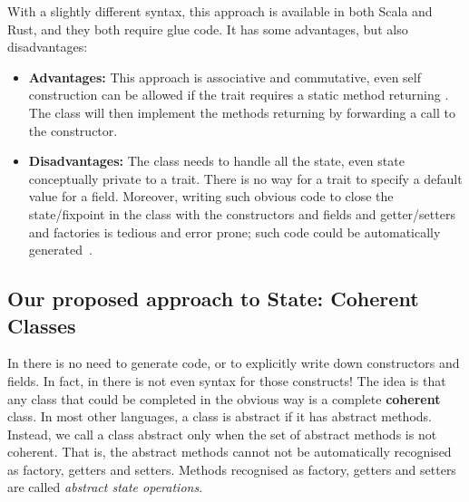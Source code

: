 \saveSpace\saveSpace

\noindent 

With a slightly different syntax, this approach is available in both Scala and Rust, and they both require glue code.
It has some advantages, but also disadvantages: 

\begin{itemize}

\item {\bf Advantages:} This approach is associative and commutative, even self construction
  can be allowed if the trait requires a static method
  returning \Q@This@. The class will then implement the methods returning \Q@This@
  by forwarding a call to the constructor.
  
\item {\bf Disadvantages:}
The class needs to handle all the state, even state conceptually
   private to a trait. 
 There is no way for a trait to specify a default value for a field.
 Moreover, writing such obvious code to close
  the state/fixpoint in the class 
   with the constructors and fields and getter/setters and factories is tedious and error prone; such code could be automatically
   generated~\cite{wang2016classless}.
\end{itemize}

\subsection{Our proposed approach to State: Coherent Classes}

In \name there is no need to generate
code, or to explicitly write down constructors and fields. In fact, in
\name there is not even syntax for those constructs!  The idea is that
any class that could be completed in the obvious way  is a
  complete \textbf{coherent} class.  In most other languages, a class is
abstract if it has abstract methods.  Instead, we call a class
abstract only when the set of abstract methods is not coherent. That
is, the abstract methods cannot not be automatically recognised
as factory, getters and setters. Methods recognised as factory, getters and setters are called
\emph{abstract state operations}.
  
